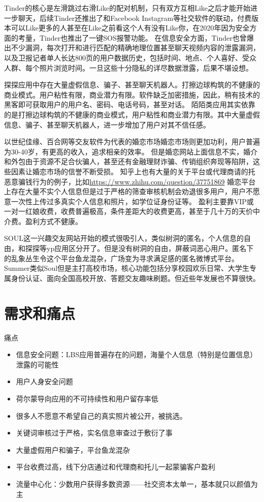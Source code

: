 \documentclass[UTF8]{ctexart}
\begin{document}
Tinder的核心是左滑跳过右滑Like的配对机制，只有双方互相Like之后才能开始进一步聊天，后续Tinder还推出了和Facebook Instagram等社交软件的联动，付费版本可以Like更多的人甚至在Like之前看这个人有没有Like你，在2020年因为安全方面的考量，Tinder也推出了一键SOS报警功能。\cite{WikiTinderFeatures}
在信息安全方面，Tinder也曾爆出不少漏洞，每次打开和进行匹配的精确地理位置甚至聊天视频内容的泄露漏洞，以及卫报记者单人长达800页的用户数据历史，包括时间、地点、个人喜好、受众人群、每个照片浏览时间。一旦这些十分隐私的详尽数据泄露，后果不堪设想。\cite{WikiTinderFeatures}

探探应用中存在大量虚假信息、骗子、甚至聊天机器人。打擦边球构筑的不健康的商业模式。用户粘性有限，商业潜力有限。软件缺乏加密措施，因此，稍有技术的黑客即可获取用户的用户名、密码、电话号码，甚至对话。\cite{WikiTantan}
陌陌类应用其实依靠的是打擦边球构筑的不健康的商业模式，用户粘性和商业潜力有限。其中大量虚假信息、骗子、甚至聊天机器人，进一步增加了用户对其不信任感。\cite{MoMoWhy}

以世纪佳缘、百合网等交友软件为代表的婚恋市场婚恋市场则更加功利，用户普遍为30-40岁，有更高的收入，追求相亲的效率。
但是婚恋网站上面信息不实，婚介和外包由于资源不足合伙骗人，甚至还有金融理财诈骗、传销组织奔现等陷阱，这些因素让婚恋市场的信誉不断受损。\cite{CheatTheLiving}
知乎上也有大量的关于平台或代理商请的托恶意骗钱行为的例子，比如\url{https://www.zhihu.com/question/37751869}
婚恋平台上存在大量不实个人信息但是过于严格的筛查审核机制会劝退很多用户，用户不愿意一次性上传过多真实个人信息和照片，如学位证身份证等。\cite{WikiJiayuan}
盈利主要靠VIP或一对一红娘收费，收费普遍极高，条件差距大的收费更高，甚至于几十万的天价中介费。盈利方式不健康。

SOUL这一兴趣交友网站开始的模式很吸引人，类似树洞的匿名，个人信息的自由，和探探等yp应用区分开了。但是没有树洞的自由，屏蔽词恶心用户。匿名下的乱象丛生令这个平台鱼龙混杂，广场变为寻求满足感的匿名微博式平台。\cite{Soul}
Summer类似Soul但是主打高校市场，核心功能包括分享校园欢乐日常、大学生专属身份认证、面向全国高校开放、答题交友趣味刷题。但近些年发展也不算很快。

\section{需求和痛点}
痛点
\begin{itemize}
    \item 信息安全问题：LBS应用普遍存在的问题，海量个人信息（特别是位置信息）泄露的可能性
    \item 用户人身安全问题
    \item 荷尔蒙导向应用的不可持续性和用户留存率低
    \item 很多人不愿意不希望自己的真实照片被公开，被挑选。
    \item 关键词审核过于严格，实名信息审查过于敷衍了事
    \item 大量虚假用户和骗子，平台鱼龙混杂
    \item 平台收费过高，线下分店通过和代理商和托儿一起蒙骗客户盈利
    \item 流量中心化：少数用户获得多数资源——社交资本太单一，基本就只以颜值为主
\end{itemize}
\end{document}
